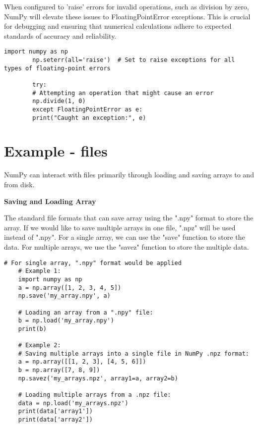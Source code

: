 When configured to 'raise' errors for invalid operations, such as division by zero, NumPy will elevate these issues to FloatingPointError exceptions. This is crucial for debugging and ensuring that numerical calculations adhere to expected standards of accuracy and reliability.

\begin{lstlisting}[caption={Example code demonstrating handling floating-point errors in NumPy}, label={code:numpy-error-handling}, style=pythonstyle]
		import numpy as np
		np.seterr(all='raise')  # Set to raise exceptions for all types of floating-point errors
		
		try:
		# Attempting an operation that might cause an error
		np.divide(1, 0)
		except FloatingPointError as e:
		print("Caught an exception:", e)
\end{lstlisting}



\section{Example - files}
NumPy can interact with files primarily through loading and saving arrays to and from disk.

\textbf{Saving and Loading Array}

The standard file formats that can save array using the ".npy" format to store the array. If we would like to save multiple arrays in one file, ".npz" will be used instead of ".npy".
For a single array, we can use the "save" function to store the data.
For multiple arrays, we use the "savez" function to store the multiple data.

\begin{lstlisting}[caption={Example code for saving and loading NumPy arrays in .npy and .npz formats}, label={code:numpy-save-load}, style=pythonstyle]
	# For single array, ".npy" format would be applied
	# Example 1:
	import numpy as np
	a = np.array([1, 2, 3, 4, 5])
	np.save('my_array.npy', a)
	
	# Loading an array from a ".npy" file:
	b = np.load('my_array.npy')
	print(b)
	
	# Example 2:
	# Saving multiple arrays into a single file in NumPy .npz format:
	a = np.array([[1, 2, 3], [4, 5, 6]])
	b = np.array([7, 8, 9])
	np.savez('my_arrays.npz', array1=a, array2=b)
	
	# Loading multiple arrays from a .npz file:
	data = np.load('my_arrays.npz')
	print(data['array1'])
	print(data['array2'])
\end{lstlisting}


